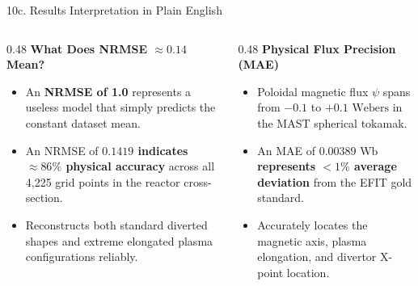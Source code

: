 \documentclass[aspectratio=169, 10pt]{beamer}
\begin{document}
\begin{frame}{10c. Results Interpretation in Plain English}
  \begin{columns}[T]
    \begin{column}{0.48\textwidth}
      \textbf{\color{NavyBlue} What Does NRMSE $\approx 0.14$ Mean?}
      \begin{itemize}
        \item An \textbf{NRMSE of 1.0} represents a useless model that simply predicts the constant dataset mean.
        \item An NRMSE of \textbf{$0.1419$ indicates $\approx 86\%$ physical accuracy} across all 4,225 grid points in the reactor cross-section.
        \item Reconstructs both standard diverted shapes and extreme elongated plasma configurations reliably.
      \end{itemize}
    \end{column}

    \begin{column}{0.48\textwidth}
      \textbf{\color{NavyBlue} Physical Flux Precision (MAE)}
      \begin{itemize}
        \item Poloidal magnetic flux $\psi$ spans from $-0.1$ to $+0.1\text{ Webers}$ in the MAST spherical tokamak.
        \item An MAE of \textbf{$0.00389\text{ Wb}$ represents $<1\%$ average deviation} from the EFIT gold standard.
        \item Accurately locates the magnetic axis, plasma elongation, and divertor X-point location.
      \end{itemize}
    \end{column}
  \end{columns}
\end{frame}

%
\end{document}
